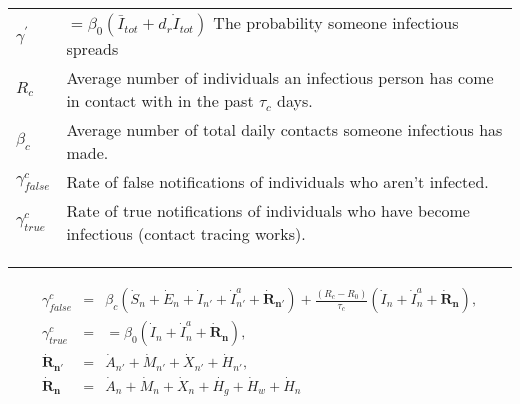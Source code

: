 \documentclass[notitlepage, superscriptaddress]{revtex4-2}
\begin{document}
\begin{table}[]
\begin{tabular}{ll}
$\gamma^{'}$                & $=\beta_{0} (\bar{I}_{tot} + d_{r} \dot{I}_{tot})$  The probability someone infectious spreads      \\
$R_{c}$             & Average number of individuals an infectious person has come in contact with in the past $\tau_{c}$ days. \\
$\beta_{c}$                 & Average number of total daily contacts someone infectious has made.                                \\
$\gamma^{c}_{false}$        & Rate of false notifications of individuals who aren't infected.                                    \\
$\gamma^{c}_{true}$ & Rate of true notifications of individuals who have become infectious (contact tracing works).            \\
                            &                                                                                                    \\
                            &                                                                                                    \\
                            &                                                                                                   
\end{tabular}
\end{table}

\begin{eqnarray}
\gamma^{c}_{false} &=& \beta_{c} (\dot{S}_{n} + \dot{E}_{n} + \dot{I}_{n'} + \dot{I}^{a}_{n'} + \boldsymbol{\dot{R}_{n'}}) + \frac{(R_{c}-R_{0})}{\tau_{c}}(\dot{I}_{n} + \dot{I}^{a}_{n} + \boldsymbol{\dot{R}_{n}}), \\
%
\gamma^{c}_{true} &=& =\beta_{0} (\dot{I}_{n} + \dot{I}^{a}_{n} + \boldsymbol{\dot{R}_{n}}), \\ 
%
\boldsymbol{\dot{R}_{n'}} &=& \dot{A}_{n'} + \dot{M}_{n'} + \dot{X}_{n'} + \dot{H}_{n'}, \\
%
\boldsymbol{\dot{R}_{n}} &=& \dot{A}_{n} + \dot{M}_{n} + \dot{X}_{n} + \dot{H_{g}} + \dot{H}_{w} + \dot{H}_{n}
\end{eqnarray}
\end{document}
